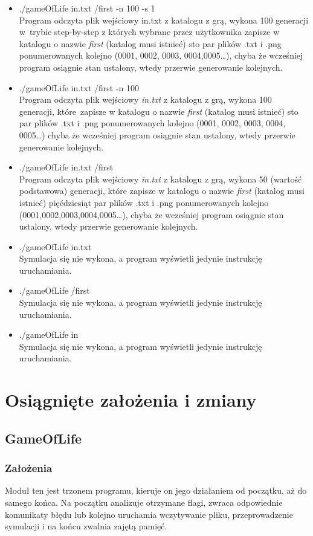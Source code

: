 \documentclass{article}
\begin{document}
\begin{itemize}
  \item ./gameOfLife in.txt /first -n 100 -s 1\\
  Program odczyta plik wejściowy in.txt z katalogu z grą, wykona 100 generacji w~trybie
step-by-step z których wybrane przez użytkownika zapisze w katalogu o
nazwie \textit{first} (katalog musi istnieć) sto par plików .txt i .png ponumerowanych
kolejno (0001, 0002, 0003, 0004,0005…), chyba że wcześniej program osiągnie stan
ustalony, wtedy przerwie generowanie kolejnych.
  \item ./gameOfLife in.txt /first -n 100 \\
  Program odczyta plik wejściowy \textit{in.txt} z katalogu z grą, wykona 100 generacji,
które~zapisze w katalogu o nazwie \textit{first} (katalog musi istnieć) sto par plików .txt i
.png ponumerowanych kolejno (0001, 0002, 0003, 0004, 0005…) chyba że
wcześniej program osiągnie stan ustalony, wtedy przerwie generowanie
kolejnych.
  \item ./gameOfLife in.txt /first \\
  Program odczyta plik wejściowy \textit{in.txt} z katalogu z grą, wykona 50 (wartość
podstawowa) generacji, które zapisze w katalogu o nazwie \textit{first} (katalog musi
istnieć) pięćdziesiąt par plików .txt i .png ponumerowanych kolejno
(0001,0002,0003,0004,0005…), chyba że wcześniej program osiągnie stan
ustalony, wtedy przerwie generowanie kolejnych.
  \item ./gameOfLife in.txt \\
  Symulacja się nie wykona, a program wyświetli jedynie instrukcję uruchamiania.
  \item ./gameOfLife /first \\
  Symulacja się nie wykona, a program wyświetli jedynie instrukcję uruchamiania.
  \item ./gameOfLife in \\
  Symulacja się nie wykona, a program wyświetli jedynie instrukcję uruchamiania.

\end{itemize}

\section{Osiągnięte założenia i zmiany}
\subsection{GameOfLife}
\subsubsection{Założenia}
Moduł ten jest trzonem programu, kieruje on jego działaniem od początku, aż
do samego końca. Na początku analizuje otrzymane flagi, zwraca
odpowiednie komunikaty błędu lub kolejno uruchamia wczytywanie pliku,
przeprowadzenie symulacji i na końcu zwalnia zajętą pamięć.
\end{document}
